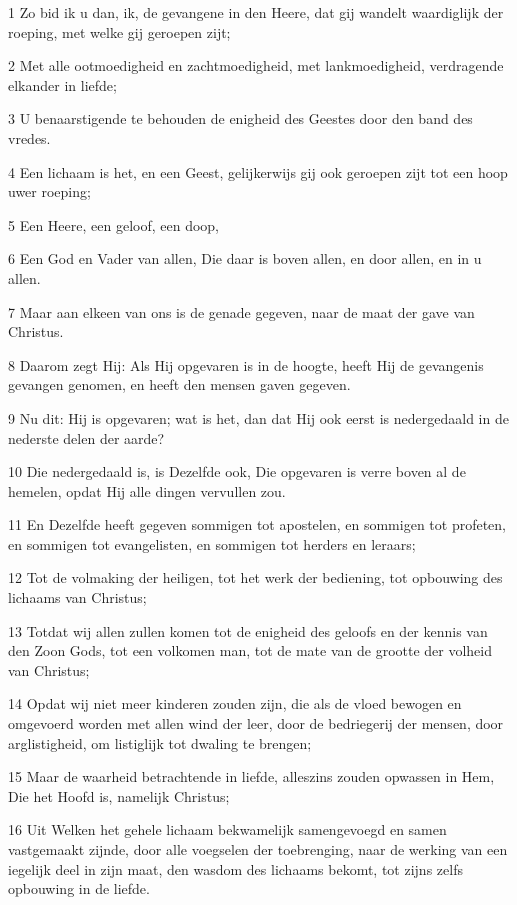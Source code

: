 \par 1 Zo bid ik u dan, ik, de gevangene in den Heere, dat gij wandelt waardiglijk der roeping, met welke gij geroepen zijt;
\par 2 Met alle ootmoedigheid en zachtmoedigheid, met lankmoedigheid, verdragende elkander in liefde;
\par 3 U benaarstigende te behouden de enigheid des Geestes door den band des vredes.
\par 4 Een lichaam is het, en een Geest, gelijkerwijs gij ook geroepen zijt tot een hoop uwer roeping;
\par 5 Een Heere, een geloof, een doop,
\par 6 Een God en Vader van allen, Die daar is boven allen, en door allen, en in u allen.
\par 7 Maar aan elkeen van ons is de genade gegeven, naar de maat der gave van Christus.
\par 8 Daarom zegt Hij: Als Hij opgevaren is in de hoogte, heeft Hij de gevangenis gevangen genomen, en heeft den mensen gaven gegeven.
\par 9 Nu dit: Hij is opgevaren; wat is het, dan dat Hij ook eerst is nedergedaald in de nederste delen der aarde?
\par 10 Die nedergedaald is, is Dezelfde ook, Die opgevaren is verre boven al de hemelen, opdat Hij alle dingen vervullen zou.
\par 11 En Dezelfde heeft gegeven sommigen tot apostelen, en sommigen tot profeten, en sommigen tot evangelisten, en sommigen tot herders en leraars;
\par 12 Tot de volmaking der heiligen, tot het werk der bediening, tot opbouwing des lichaams van Christus;
\par 13 Totdat wij allen zullen komen tot de enigheid des geloofs en der kennis van den Zoon Gods, tot een volkomen man, tot de mate van de grootte der volheid van Christus;
\par 14 Opdat wij niet meer kinderen zouden zijn, die als de vloed bewogen en omgevoerd worden met allen wind der leer, door de bedriegerij der mensen, door arglistigheid, om listiglijk tot dwaling te brengen;
\par 15 Maar de waarheid betrachtende in liefde, alleszins zouden opwassen in Hem, Die het Hoofd is, namelijk Christus;
\par 16 Uit Welken het gehele lichaam bekwamelijk samengevoegd en samen vastgemaakt zijnde, door alle voegselen der toebrenging, naar de werking van een iegelijk deel in zijn maat, den wasdom des lichaams bekomt, tot zijns zelfs opbouwing in de liefde.
